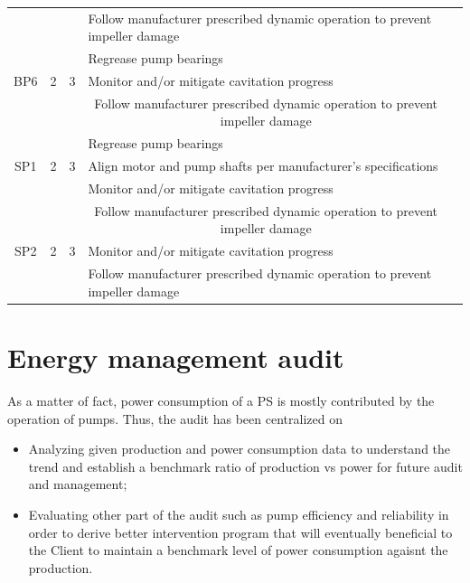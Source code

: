\begin{table}[!h]
{\begin{tabular}{l|l|l|l|c}
	\multicolumn{1}{c|}{} & \multicolumn{1}{c|}{} & \multicolumn{1}{c|}{} & Follow manufacturer prescribed dynamic operation to prevent impeller damage &  \\ 
	\multicolumn{1}{c|}{} & \multicolumn{1}{c|}{} & \multicolumn{1}{c|}{} & Regrease pump bearings &  \\ 
	\hline
	\multicolumn{1}{c|}{BP6} & \multicolumn{1}{c|}{2} & \multicolumn{1}{c|}{3} & Monitor and/or mitigate cavitation progress &  \\ 
	\multicolumn{1}{c|}{} & \multicolumn{1}{c|}{} & \multicolumn{1}{c|}{} & \multicolumn{1}{c|}{Follow manufacturer prescribed dynamic operation to prevent impeller damage} &  \\ 
	\multicolumn{1}{c|}{} & \multicolumn{1}{c|}{} & \multicolumn{1}{c|}{} & Regrease pump bearings &  \\ 
	\hline
	\multicolumn{1}{c|}{SP1} & \multicolumn{1}{c|}{2} & \multicolumn{1}{c|}{3} & Align motor and pump shafts per manufacturer's specifications  &  \\ 
	\multicolumn{1}{c|}{} & \multicolumn{1}{c|}{} & \multicolumn{1}{c|}{} & Monitor and/or mitigate cavitation progress &  \\ 
	\multicolumn{1}{c|}{} & \multicolumn{1}{c|}{} & \multicolumn{1}{c|}{} & \multicolumn{1}{c|}{Follow manufacturer prescribed dynamic operation to prevent impeller damage} &  \\ 
	\hline
	\multicolumn{1}{c|}{SP2} & \multicolumn{1}{c|}{2} & \multicolumn{1}{c|}{3} & Monitor and/or mitigate cavitation progress &  \\ 
	\multicolumn{1}{c|}{} & \multicolumn{1}{c|}{} & \multicolumn{1}{c|}{} & Follow manufacturer prescribed dynamic operation to prevent impeller damage &  \\ 
	\hline
\end{tabular}

	}
\end{table}


\section{Energy management audit}
As a matter of fact, power consumption of a PS is mostly contributed by the operation of pumps. Thus, the audit has been centralized on 
\begin{itemize}
\item Analyzing given production and power consumption data to understand the trend and establish a benchmark ratio of production vs power for future audit and management;
\item Evaluating other part of the audit such as pump efficiency and reliability in order to derive better intervention program that will eventually beneficial to the Client to maintain a benchmark level of power consumption agaisnt the production. 
\end{itemize}


